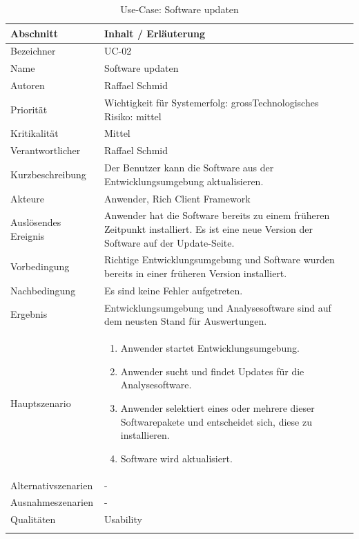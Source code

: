 \begin{longtable}{|p{4cm}|p{10.5cm}|}
\hline
   \textbf{Abschnitt} & \textbf{Inhalt / Erläuterung} \\\hline
   Bezeichner & UC-02\\\hline
   Name & Software updaten\\\hline
   Autoren & Raffael Schmid\\\hline
   Priorität & Wichtigkeit für Systemerfolg: gross\newline Technologisches Risiko: mittel\\\hline
   Kritikalität & Mittel\\\hline
   Verantwortlicher & Raffael Schmid\\\hline
   Kurzbeschreibung & Der Benutzer kann die Software aus der Entwicklungsumgebung aktualisieren.\\\hline
   Akteure & Anwender, Rich Client Framework\\\hline   
   Auslösendes Ereignis & Anwender hat die Software bereits zu einem früheren Zeitpunkt installiert. Es ist eine neue Version der Software auf der Update-Seite.\\\hline
   Vorbedingung & Richtige Entwicklungsumgebung und Software wurden bereits in einer früheren Version installiert.\\\hline
   Nachbedingung & Es sind keine Fehler aufgetreten.\\\hline
   Ergebnis & Entwicklungsumgebung und Analysesoftware sind auf dem neusten Stand für Auswertungen.\\\hline
   Hauptszenario & 
	\begin{enumerate}
		\item Anwender startet Entwicklungsumgebung.
		\item Anwender sucht und findet Updates für die Analysesoftware.
		\item Anwender selektiert eines oder mehrere dieser Softwarepakete und entscheidet sich, diese zu installieren.
		\item Software wird aktualisiert.
	\end{enumerate}
	\\\hline
   Alternativszenarien & -\\\hline
   Ausnahmeszenarien & -\\\hline
   Qualitäten & Usability\\\hline
\caption{Use-Case: Software updaten}
\end{longtable}

